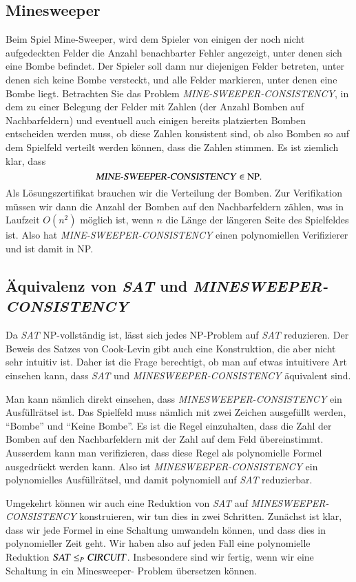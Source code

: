 \subsection{Minesweeper}
%
Beim Spiel Mine-Sweeper, wird dem Spieler von einigen der noch nicht
aufgedeckten Felder die Anzahl benachbarter Fehler angezeigt, unter
denen sich eine Bombe befindet.
Der Spieler soll dann nur diejenigen
Felder betreten, unter denen sich keine Bombe versteckt, und alle
Felder markieren, unter denen eine Bombe liegt.
Betrachten Sie das
Problem {\it MINE-SWEEPER-CONSISTENCY}, in dem zu einer Belegung der
Felder mit Zahlen (der Anzahl Bomben auf Nachbarfeldern) und eventuell
auch einigen bereits platzierten Bomben entscheiden
werden muss, ob diese Zahlen konsistent sind, ob also Bomben so
auf dem Spielfeld verteilt werden können, dass die Zahlen stimmen.
Es ist ziemlich klar, dass
\[
\text{\textsl{MINE-SWEEPER-CONSISTENCY}}\in \text{NP}.
\]
Als Lösungszertifikat brauchen wir die Verteilung der Bomben.
Zur Verifikation müssen wir dann die Anzahl der Bomben auf den
Nachbarfeldern zählen, was in Laufzeit $O(n^2)$ möglich ist,
wenn $n$ die Länge der längeren Seite des Spielfeldes ist.
Also hat
\textsl{MINE-SWEEPER-CONSISTENCY} einen polynomiellen Verifizierer und
ist damit in NP.

\subsection{Äquivalenz von \textsl{SAT} und \textsl{MINESWEEPER-CONSISTENCY}}
Da \textsl{SAT} NP-vollständig ist, lässt sich jedes NP-Problem auf
\textsl{SAT} reduzieren.
Der Beweis des Satzes von Cook-Levin gibt
auch eine Konstruktion, die aber nicht sehr intuitiv ist.
Daher ist die Frage berechtigt, ob man auf etwas intuitivere Art einsehen
kann, dass
\textsl{SAT}
und
\textsl{MINESWEEPER-CONSISTENCY}
äquivalent sind.

Man kann nämlich direkt einsehen, dass \textsl{MINESWEEPER-CONSISTENCY}
ein Ausfüllrätsel ist.
Das Spielfeld muss nämlich mit zwei Zeichen ausgefüllt werden, ``Bombe''
und ``Keine Bombe''.
Es ist die Regel einzuhalten, dass die Zahl der Bomben auf den Nachbarfeldern
mit der Zahl auf dem Feld übereinstimmt.
Ausserdem kann man verifizieren, dass diese Regel als polynomielle Formel
ausgedrückt werden kann.
Also ist \textsl{MINESWEEPER-CONSISTENCY} ein polynomielles
Ausfüllrätsel, und damit polynomiell auf \textsl{SAT} reduzierbar.

Umgekehrt können wir auch eine Reduktion von \textsl{SAT} auf
\textsl{MINESWEEPER-CONSISTENCY} konstruieren, wir tun dies in
zwei Schritten.
Zunächst ist
klar, dass wir jede Formel in eine Schaltung umwandeln können, und
dass dies in polynomieller Zeit geht.
Wir haben also auf jeden
Fall eine polynomielle Reduktion $\text{\textsl{SAT}}\le_P\text{\textsl{CIRCUIT}}$.
Insbesondere sind wir fertig, wenn wir eine Schaltung in ein Minesweeper-%
Problem übersetzen können.

